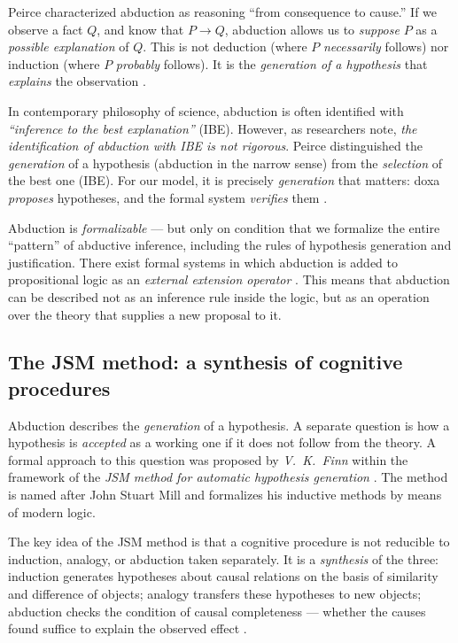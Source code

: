\documentclass[12pt,a4paper]{article}
\begin{document}
Peirce characterized abduction as reasoning ``from consequence to cause.'' If
we observe a fact $Q$, and know that $P \to Q$, abduction allows us to
\emph{suppose} $P$ as a \emph{possible explanation} of $Q$. This is not
deduction (where $P$ \emph{necessarily} follows) nor induction (where $P$
\emph{probably} follows). It is the \emph{generation of a hypothesis} that
\emph{explains} the observation \cite{peirce_cp}.

In contemporary philosophy of science, abduction is often identified with
\emph{``inference to the best explanation''} (IBE). However, as researchers
note, \emph{the identification of abduction with IBE is not rigorous}. Peirce
distinguished the \emph{generation} of a hypothesis (abduction in the narrow
sense) from the \emph{selection} of the best one (IBE). For our model, it is
precisely \emph{generation} that matters: doxa \emph{proposes} hypotheses, and
the formal system \emph{verifies} them \cite{niiniluoto}.

Abduction is \emph{formalizable} --- but only on condition that we formalize
the entire ``pattern'' of abductive inference, including the rules of
hypothesis generation and justification. There exist formal systems in which
abduction is added to propositional logic as an \emph{external extension
operator} \cite{kakas}. This means that abduction can be described not as an
inference rule inside the logic, but as an operation over the theory that
supplies a new proposal to it.

\subsection{The JSM method: a synthesis of cognitive procedures}
\label{sec:dsm}

Abduction describes the \emph{generation} of a hypothesis. A separate
question is how a hypothesis is \emph{accepted} as a working one if it does not
follow from the theory. A formal approach to this question was proposed by
\emph{V.~K.~Finn} within the framework of the \emph{JSM method for automatic
hypothesis generation} \cite{finn_dsm}. The method is named after John Stuart
Mill and formalizes his inductive methods by means of modern logic.

The key idea of the JSM method is that a cognitive procedure is not reducible
to induction, analogy, or abduction taken separately. It is a \emph{synthesis}
of the three: induction generates hypotheses about causal relations on the
basis of similarity and difference of objects; analogy transfers these
hypotheses to new objects; abduction checks the condition of causal
completeness --- whether the causes found suffice to explain the observed
effect \cite{finn_voprosy, finn_epistemology}.
\end{document}
